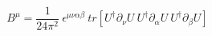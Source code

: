 \begin{equation}
B^\mu= \frac{1}{24\pi^2}~\epsilon^{\mu\nu\alpha\beta}~tr[ U^\dag \partial_\nu U~ U^\dag \partial_\alpha U~
U^\dag \partial_\beta U ]
\end{equation}

